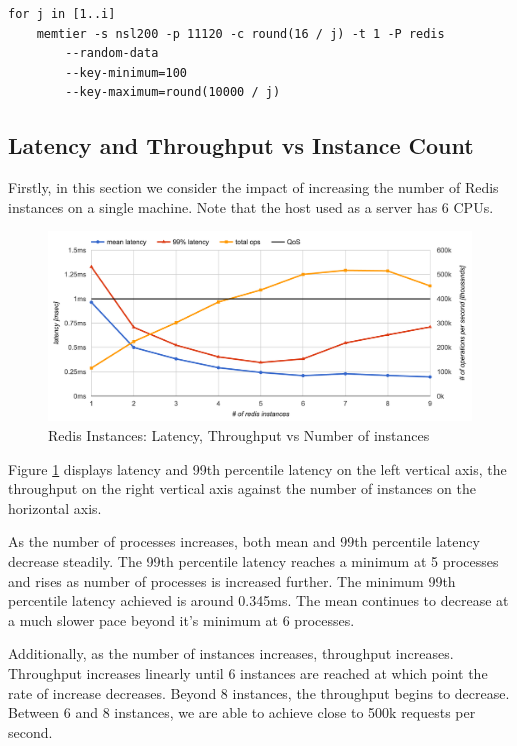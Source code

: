 \begin{lstlisting}
for j in [1..i]
    memtier -s nsl200 -p 11120 -c round(16 / j) -t 1 -P redis
        --random-data
        --key-minimum=100
        --key-maximum=round(10000 / j)
\end{lstlisting}

\subsection{Latency and Throughput vs Instance Count}

Firstly, in this section we consider the impact of increasing the number of Redis instances on a single machine. Note that the host used as a server has 6 CPUs.

\begin{figure}[h]
    \includegraphics[width=\textwidth]{./res/6_instances_latency_ops.png}
    \caption{Redis Instances: Latency, Throughput vs Number of instances}
    \label{fig:redis-instances-latency-ops}
\end{figure}

Figure \ref{fig:redis-instances-latency-ops} displays latency and 99th percentile latency on the left vertical axis, the throughput on the right vertical axis against the number of instances on the horizontal axis.

As the number of processes increases, both mean and 99th percentile latency decrease steadily. The 99th percentile latency reaches a minimum at 5 processes and rises as number of processes is increased further. The minimum 99th percentile latency achieved is around 0.345ms. The mean continues to decrease at a much slower pace beyond it's minimum at 6 processes.

Additionally, as the number of instances increases, throughput increases. Throughput increases linearly until 6 instances are reached at which point the rate of increase decreases. Beyond 8 instances, the throughput begins to decrease. Between 6 and 8 instances, we are able to achieve close to 500k requests per second.

